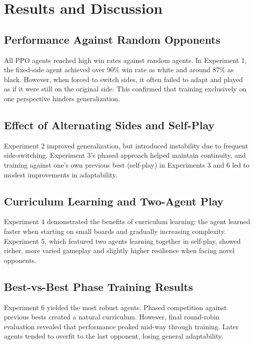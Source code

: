 \documentclass[conference]{IEEEtran}
\begin{document}
\section{Results and Discussion}

\subsection{Performance Against Random Opponents}

All PPO agents reached high win rates against random agents. In Experiment 1, the fixed-side agent achieved over 90\% win rate as white and around 87\% as black. However, when forced to switch sides, it often failed to adapt and played as if it were still on the original side. This confirmed that training exclusively on one perspective hinders generalization.

\subsection{Effect of Alternating Sides and Self-Play}

Experiment 2 improved generalization, but introduced instability due to frequent side-switching. Experiment 3's phased approach helped maintain continuity, and training against one's own previous best (self-play) in Experiments 3 and 6 led to modest improvements in adaptability.

\subsection{Curriculum Learning and Two-Agent Play}

Experiment 4 demonstrated the benefits of curriculum learning: the agent learned faster when starting on small boards and gradually increasing complexity. Experiment 5, which featured two agents learning together in self-play, showed richer, more varied gameplay and slightly higher resilience when facing novel opponents.

\subsection{Best-vs-Best Phase Training Results}

Experiment 6 yielded the most robust agents. Phased competition against previous bests created a natural curriculum. However, final round-robin evaluation revealed that performance peaked mid-way through training. Later agents tended to overfit to the last opponent, losing general adaptability.
\end{document}
